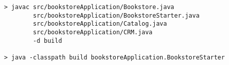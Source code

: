 \begin{lstlisting}[caption=Compile and run under Windows]
> javac src/bookstoreApplication/Bookstore.java 
        src/bookstoreApplication/BookstoreStarter.java 
        src/bookstoreApplication/Catalog.java 
        src/bookstoreApplication/CRM.java 
        -d build

> java -classpath build bookstoreApplication.BookstoreStarter 
\end{lstlisting}
